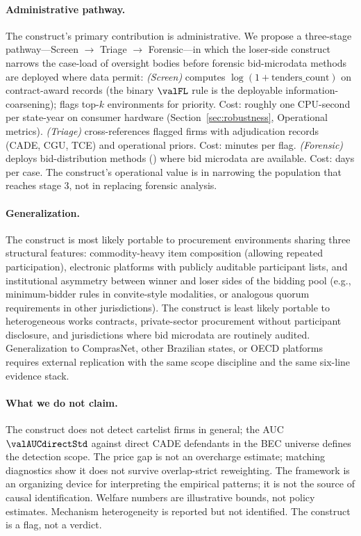 \paragraph{Administrative pathway.}
The construct's primary contribution is administrative. We propose a
three-stage pathway---Screen $\to$ Triage $\to$ Forensic---in which
the loser-side construct narrows the case-load of oversight bodies
before forensic bid-microdata methods are deployed where data
permit:
\emph{(Screen)} computes $\log(1+\text{tenders\_count})$ on
contract-award records (the binary $\valFL$ rule is the deployable
information-coarsening); flags top-$k$ environments for
priority. Cost: roughly one CPU-second per state-year on consumer
hardware (Section~\ref{sec:robustness}, Operational metrics).
\emph{(Triage)} cross-references flagged firms with adjudication
records (CADE, CGU, TCE) and operational priors. Cost: minutes per
flag. \emph{(Forensic)} deploys bid-distribution methods
(\citet{imhof2019detecting,wallimann2023machine}) where bid
microdata are available. Cost: days per case. The construct's
operational value is in narrowing the population that reaches stage
3, not in replacing forensic analysis.

\paragraph{Generalization.}
The construct is most likely portable to procurement environments
sharing three structural features: commodity-heavy item composition
(allowing repeated participation), electronic platforms with publicly
auditable participant lists, and institutional asymmetry between
winner and loser sides of the bidding pool (e.g., minimum-bidder
rules in convite-style modalities, or analogous quorum requirements
in other jurisdictions). The construct is least likely portable to
heterogeneous works contracts, private-sector procurement without
participant disclosure, and jurisdictions where bid microdata are
routinely audited. Generalization to ComprasNet, other Brazilian
states, or OECD platforms requires external replication with the
same scope discipline and the same six-line evidence stack.

\paragraph{What we do not claim.}
The construct does not detect cartelist firms in general; the AUC
$\valAUCdirectStd$ against direct CADE defendants in the BEC universe
defines the detection scope. The price gap is not an overcharge
estimate; matching diagnostics show it does not survive
overlap-strict reweighting. The framework is an organizing device for
interpreting the empirical patterns; it is not the source of causal
identification. Welfare numbers are illustrative bounds, not policy
estimates. Mechanism heterogeneity is reported but not identified.
The construct is a flag, not a verdict.
